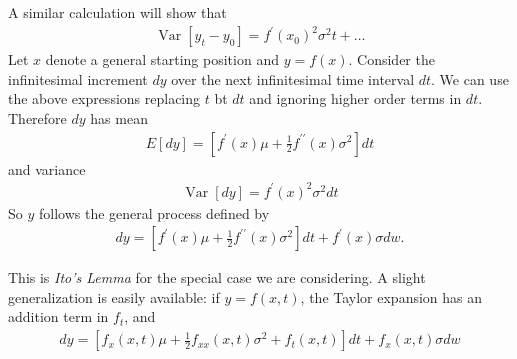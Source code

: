 \documentclass[\topdir/lecture\_notes.tex]{subfiles}
\begin{document}
A similar calculation will show that
\begin{align*}
\operatorname{Var}\left[y_{t}-y_{0}\right]=f^{\prime}\left(x_{0}\right)^{2} \sigma^{2} t+\ldots
\end{align*}
Let $x$ denote a general starting position and $y=f(x)$. Consider the infinitesimal increment $d y$ over the next infinitesimal time interval $dt$. We can use the above expressions replacing $t$ bt $dt$ and ignoring higher order terms in $dt$. Therefore $d y$ has mean
\begin{align*}
E[d y]=\left[f^{\prime}(x) \mu+\frac{1}{2} f^{\prime \prime}(x) \sigma^{2}\right] dt
\end{align*}
and variance
\begin{align*}
\operatorname{Var}[d y]=f^{\prime}(x)^{2} \sigma^{2} dt
\end{align*}
So $y$ follows the general process defined by
\begin{align}
d y=\left[f^{\prime}(x) \mu+\frac{1}{2} f^{\prime \prime}(x) \sigma^{2}\right] dt+f^{\prime}(x) \sigma dw . \label{eq:ito_lemma_simple}
\end{align}

This is \emph{Ito's Lemma} for the special case we are considering. A slight generalization is easily available: if $y=f(x, t)$, the Taylor expansion has an addition term in $f_{t}$, and
\begin{align}
d y=\left[f_{x}(x, t) \mu+\frac{1}{2} f_{x x}(x, t) \sigma^{2}+f_{t}(x, t)\right] dt+f_{x}(x, t) \sigma dw
\end{align}
\end{document}
